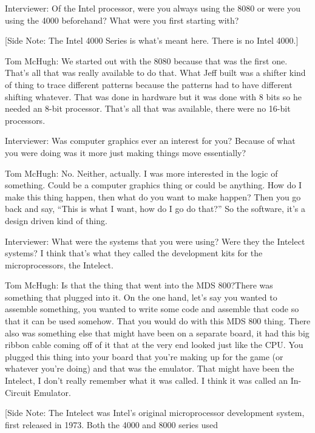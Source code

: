 \textcolor{interviewer}{Interviewer:} Of the Intel processor, were you always using the 8080 or were you using the 4000 beforehand?  What were you first starting with?

[Side Note: The Intel 4000 Series is what’s meant here. There is no Intel 4000.]

\textcolor{interviewee}{Tom McHugh:} We started out with the 8080 because that was the first one. That’s all that was really available to do that. What Jeff built was a shifter kind of thing to trace different patterns because the patterns had to have different shifting whatever. That was done in hardware but it was done with 8 bits so he needed an 8-bit processor. That’s all that was available, there were no 16-bit processors.

\textcolor{interviewer}{Interviewer:} Was computer graphics ever an interest for you? Because of what you were doing was it more just making things move essentially?

\textcolor{interviewee}{Tom McHugh:} No. Neither, actually. I was more interested in the logic of something. Could be a computer graphics thing or could be anything. How do I make this thing happen, then what do you want to make happen? Then you go back and say, “This is what I want, how do I go do that?” So the software, it’s a design driven kind of thing.

\textcolor{interviewer}{Interviewer:} What were the systems that you were using? Were they the Intelect systems? I think that’s what they called the development kits for the microprocessors, the Intelect.

\textcolor{interviewee}{Tom McHugh:} Is that the thing that went into the MDS 800?There was something that plugged into it. On the one hand, let’s say you wanted to assemble something, you wanted to write some code and assemble that code so that it can be used somehow. That you would do with this MDS 800 thing. There also was something else that might have been on a separate board, it had this big ribbon cable coming off of it that at the very end looked just like the CPU. You plugged this thing into your board that you’re making up for the game (or whatever you’re doing) and that was the emulator. That might have been the Intelect, I don’t really remember what it was called. I think it was called an In-Circuit Emulator.

[Side Note: The Intelect was Intel’s original microprocessor development system, first released in 1973. Both the 4000 and 8000 series used 

